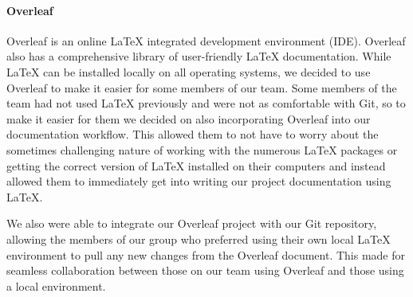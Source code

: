 \paragraph{Overleaf}
Overleaf is an online LaTeX integrated development environment (IDE). Overleaf also has a comprehensive library of user-friendly LaTeX documentation. While LaTeX can be installed locally on all operating systems, we decided to use Overleaf to make it easier for some members of our team. Some members of the team had not used LaTeX previously and were not as comfortable with Git, so to make it easier for them we decided on also incorporating Overleaf into our documentation workflow. This allowed them to not have to worry about the sometimes challenging nature of working with the numerous LaTeX packages or getting the correct version of LaTeX installed on their computers and instead allowed them to immediately get into writing our project documentation using LaTeX.

We also were able to integrate our Overleaf project with our Git repository, allowing the members of our group who preferred using their own local LaTeX environment to pull any new changes from the Overleaf document. This made for seamless collaboration between those on our team using Overleaf and those using a local environment.


